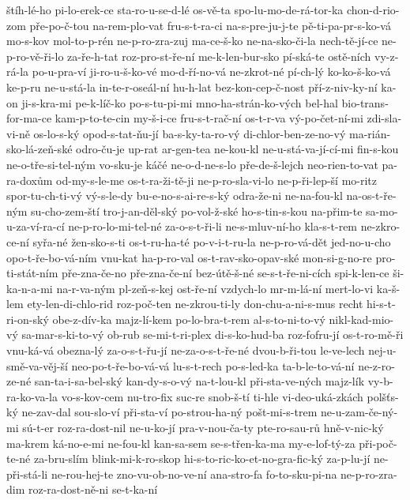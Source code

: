 {štíh-lé-ho
pi-lo-erek-ce
sta-ro-u-se-d-lé
os-vě-ta
spo-lu-mo-de-rá-tor-ka
chon-d-rio-zom
pře-po-č-tou
na-rem-plo-vat
fru-s-t-ra-ci
na-s-pre-ju-j-te
pě-ti-pa-pr-s-ko-vá
mo-s-kov
mol-to-p-rén
ne-p-ro-zra-zuj
ma-ce-š-ko
ne-na-sko-či-la
nech-tě-jí-ce
ne-p-ro-vě-ři-lo
za-ře-h-tat
roz-pro-st-ře-ní
me-k-len-bur-sko
pí-ská-te
ostě-ních
vy-z-rá-la
po-u-pra-ví
ji-ro-u-š-ko-vé
mo-d-ří-no-vá
ne-zkrot-né
pí-ch-lý
ko-ko-š-ko-vá
ke-p-ru
ne-u-stá-la
in-te-r-oseál-ní
hu-h-lat
bez-kon-cep-č-nost
pří-z-niv-ky-ní
ka-on
ji-s-kra-mi
pe-k-líč-ko
po-s-tu-pi-mi
mno-ha-strán-ko-vých
bel-hal
bio-trans-for-ma-ce
kam-p-to-te-cin
my-š-i-ce
fru-s-t-rač-ní
os-t-r-va
vý-po-čet-ní-mi
zdi-sla-vi-ně
os-lo-s-ký
opod-s-tat-ňu-jí
ba-s-ky-ta-ro-vý
di-chlor-ben-ze-no-vý
ma-rián-sko-lá-zeň-ské
odro-ču-je
up-rat
ar-gen-tea
ne-kou-kl
ne-u-stá-va-jí-cí-mi
fin-s-kou
ne-o-tře-si-tel-ným
vo-sku-je
káčé
ne-o-d-ne-s-lo
pře-de-š-lejch
neo-rien-to-vat
pa-ra-doxům
od-my-s-le-me
os-t-ra-ži-tě-ji
ne-p-ro-sla-vi-lo
ne-p-ři-lep-ší
mo-ritz
spor-tu-ch-ti-vý
vý-s-le-dy
bu-e-no-s-ai-re-s-ký
odra-že-ni
ne-na-fou-kl
na-os-t-ře-ným
su-cho-zem-ští
tro-j-an-děl-ský
po-vol-ž-ské
ho-s-tin-s-kou
na-přim-te
sa-mo-u-za-ví-ra-cí
ne-p-ro-lo-mi-tel-né
za-o-s-t-ři-li
ne-s-mluv-ní-ho
kla-s-t-rem
ne-zkro-ce-ní
syřa-né
žen-sko-s-ti
os-t-ru-ha-té
po-v-i-t-ru-la
ne-p-ro-vá-dět
jed-no-u-cho
opo-t-ře-bo-vá-ním
vnu-kat
ha-p-ro-val
os-t-rav-sko-opav-ské
mon-si-g-no-re
pro-ti-stát-ním
pře-zna-če-no
pře-zna-če-ní
bez-útě-š-né
se-s-t-ře-ni-cích
spi-k-len-ce
ši-ka-n-a-mi
na-r-va-ným
pl-zeň-s-kej
ost-ře-ní
vzdych-lo
mr-m-lá-ní
mert-lo-vi
ka-š-lem
ety-len-di-chlo-rid
roz-poč-ten
ne-zkrou-ti-ly
don-chu-a-ni-s-mus
recht
hi-s-t-ri-on-ský
obe-z-dív-ka
majz-lí-kem
po-lo-bra-t-rem
al-s-to-ni-to-vý
nikl-kad-mio-vý
sa-mar-s-ki-to-vý
ob-rub
se-mi-t-ri-plex
di-s-ko-hud-ba
roz-fofru-jí
os-t-ro-mě-ři
vnu-ká-vá
obezna-lý
za-o-s-t-řu-jí
ne-za-o-s-t-ře-né
dvou-b-ři-tou
le-ve-lech
nej-u-smě-va-věj-ší
neo-po-t-ře-bo-vá-vá
lu-s-t-rech
po-s-led-ka
ta-b-le-to-vá-ní
ne-z-ro-ze-né
san-ta-i-sa-bel-ský
kan-dy-s-o-vý
na-t-lou-kl
při-sta-ve-ných
majz-lík
vy-b-ra-ko-va-la
vo-s-kov-cem
nu-tro-fix
suc-re
snob-š-tí
ti-hle
vi-deo-uká-zkách
polšťs-ký
ne-zav-dal
sou-slo-ví
při-sta-ví
po-strou-ha-ný
pošt-mi-s-trem
ne-u-zam-če-ný-mi
sú-t-er
roz-ra-dost-nil
ne-u-ko-jí
pra-v-nou-ča-ty
pte-ro-sau-rů
hně-v-nic-ký
ma-krem
ká-no-e-mi
ne-fou-kl
kan-sa-sem
se-s-třen-ka-ma
my-e-lof-tý-za
při-poč-te-né
za-bru-slím
blink-mi-k-ro-skop
hi-s-to-ric-ko-et-no-gra-fic-ký
za-p-lu-jí
ne-při-stá-li
ne-rou-hej-te
zno-vu-ob-no-ve-ní
ana-stro-fa
fo-to-sku-pi-na
ne-p-ro-zra-dim
roz-ra-dost-ně-ni
se-t-ka-ní
}
